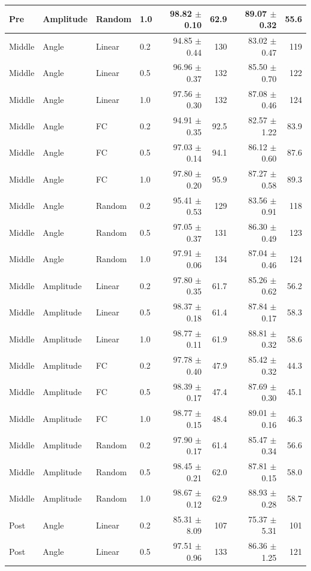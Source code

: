 \begin{table}[!t]
\begin{tabular}{llllrrrr}
Pre & Amplitude & Random & 1.0 & 98.82 $\pm$ 0.10 & 62.9 & 89.07 $\pm$ 0.32 & 55.6 \\
\midrule
Middle & Angle & Linear & 0.2 & 94.85 $\pm$ 0.44 & 130 & 83.02 $\pm$ 0.47 & 119 \\
Middle & Angle & Linear & 0.5 & 96.96 $\pm$ 0.37 & 132 & 85.50 $\pm$ 0.70 & 122 \\
Middle & Angle & Linear & 1.0 & 97.56 $\pm$ 0.30 & 132 & 87.08 $\pm$ 0.46 & 124 \\
Middle & Angle & FC & 0.2 & 94.91 $\pm$ 0.35 & 92.5 & 82.57 $\pm$ 1.22 & 83.9 \\
Middle & Angle & FC & 0.5 & 97.03 $\pm$ 0.14 & 94.1 & 86.12 $\pm$ 0.60 & 87.6 \\
Middle & Angle & FC & 1.0 & 97.80 $\pm$ 0.20 & 95.9 & 87.27 $\pm$ 0.58 & 89.3 \\
Middle & Angle & Random & 0.2 & 95.41 $\pm$ 0.53 & 129 & 83.56 $\pm$ 0.91 & 118 \\
Middle & Angle & Random & 0.5 & 97.05 $\pm$ 0.37 & 131 & 86.30 $\pm$ 0.49 & 123 \\
Middle & Angle & Random & 1.0 & 97.91 $\pm$ 0.06 & 134 & 87.04 $\pm$ 0.46 & 124 \\
\midrule
Middle & Amplitude & Linear & 0.2 & 97.80 $\pm$ 0.35 & 61.7 & 85.26 $\pm$ 0.62 & 56.2 \\
Middle & Amplitude & Linear & 0.5 & 98.37 $\pm$ 0.18 & 61.4 & 87.84 $\pm$ 0.17 & 58.3 \\
Middle & Amplitude & Linear & 1.0 & 98.77 $\pm$ 0.11 & 61.9 & 88.81 $\pm$ 0.32 & 58.6 \\
Middle & Amplitude & FC & 0.2 & 97.78 $\pm$ 0.40 & 47.9 & 85.42 $\pm$ 0.32 & 44.3 \\
Middle & Amplitude & FC & 0.5 & 98.39 $\pm$ 0.17 & 47.4 & 87.69 $\pm$ 0.30 & 45.1 \\
Middle & Amplitude & FC & 1.0 & 98.77 $\pm$ 0.15 & 48.4 & 89.01 $\pm$ 0.16 & 46.3 \\
Middle & Amplitude & Random & 0.2 & 97.90 $\pm$ 0.17 & 61.4 & 85.47 $\pm$ 0.34 & 56.6 \\
Middle & Amplitude & Random & 0.5 & 98.45 $\pm$ 0.21 & 62.0 & 87.81 $\pm$ 0.15 & 58.0 \\
Middle & Amplitude & Random & 1.0 & 98.67 $\pm$ 0.12 & 62.9 & 88.93 $\pm$ 0.28 & 58.7 \\
\midrule
Post & Angle & Linear & 0.2 & 85.31 $\pm$ 8.09 & 107 & 75.37 $\pm$ 5.31 & 101 \\
Post & Angle & Linear & 0.5 & 97.51 $\pm$ 0.96 & 133 & 86.36 $\pm$ 1.25 & 121 \\

\end{tabular}
\end{table}
